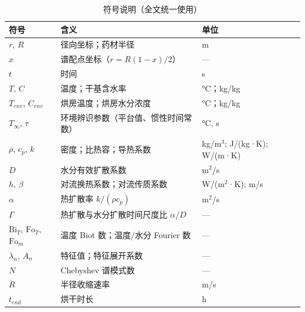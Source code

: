 \begin{table}[H]
\centering
\caption{符号说明（全文统一使用）}
\begin{tabular}{p{2.2cm}p{6.6cm}p{3.6cm}}
\toprule
符号 & 含义 & 单位 \\
\midrule
$r$, $R$ & 径向坐标；药材半径 & m \\
$x$ & 谱配点坐标（$r=R(1-x)/2$） & --- \\
$t$ & 时间 & s \\
$T$, $C$ & 温度；干基含水率 & °C；kg/kg \\
$T_{env}$, $C_{env}$ & 烘房温度；烘房水分浓度 & °C；kg/kg \\
$T_\infty$, $\tau$ & 环境辨识参数（平台值、惯性时间常数） & °C, s \\
$\rho$, $c_p$, $k$ & 密度；比热容；导热系数 & kg/m$^3$; J/(kg·K); W/(m·K) \\
$D$ & 水分有效扩散系数 & m$^2$/s \\
$h$, $\beta$ & 对流换热系数；对流传质系数 & W/(m$^2$·K); m/s \\
$\alpha$ & 热扩散率 $k/(\rho c_p)$ & m$^2$/s \\
$\Gamma$ & 热扩散与水分扩散时间尺度比 $\alpha/D$ & --- \\
$\mathrm{Bi}_T$, $\mathrm{Fo}_T$, $\mathrm{Fo}_m$ & 温度 Biot 数；温度/水分 Fourier 数 & --- \\
$\lambda_n$, $A_n$ & 特征值；特征展开系数 & --- \\
$N$ & Chebyshev 谱模式数 & --- \\
$\dot R$ & 半径收缩速率 & m/s \\
$t_{end}$ & 烘干时长 & h \\
\bottomrule
\end{tabular}
\end{table}
